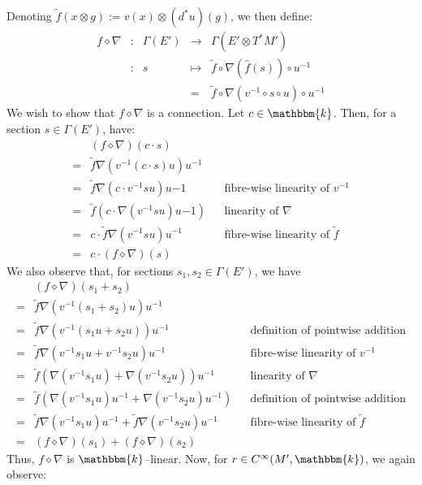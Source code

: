 \documentclass{amsart}
\newcommand{\K}{\mathbbm{k}}
\newcommand{\wh}{\widehat}
\newcommand{\tensor}{\otimes}
\renewcommand{\to}[1][]{\stackrel{#1}{\longrightarrow}}
\renewcommand{\mapsto}{\longmapsto}
\newcommand{\Cinf}{C^{\infty}}
\numberwithin{thm}{section}
\theoremstyle{definition}
\begin{document}
Denoting $\tilde{f}(x \tensor g) := v(x) \tensor (d^*u)(g)$, we then define:
\[\begin{array}{ccccc}
f \diamond \nabla
&:& \Gamma(E') &\to    & \Gamma(E' \tensor T^*M') \\
&:& s &\mapsto& \tilde{f} \circ \nabla(\wh{f}(s)) \circ u^{-1} \\
&&& = &
  \tilde{f} \circ \nabla(v^{-1} \circ s \circ u) \circ u^{-1}
\end{array}\]
We wish to show that $f \diamond \nabla$ is a connection.
Let $c \in \K$. Then, for a section $s \in \Gamma(E')$, have:
\begin{align*}
   & (f \diamond \nabla)(c \cdot s) \\
  =& \tilde{f}\nabla(v^{-1}(c \cdot s)u)u^{-1} \\
  =& \tilde{f}\nabla(c \cdot v^{-1}su)u{-1}
      && \text{fibre-wise linearity of } v^{-1} \\
  =& \tilde{f} (c \cdot  \nabla(v^{-1}su)u{-1})
      && \text{linearity of } \nabla \\
  =& c \cdot \tilde{f}\nabla(v^{-1}su)u^{-1}
      && \text{fibre-wise linearity of } \tilde{f} \\
  =& c \cdot (f \diamond \nabla)(s)
\end{align*}
We also observe that, for sections $s_1, s_2 \in \Gamma(E')$, we have
\begin{align*}
   & (f \diamond \nabla)(s_1 + s_2)\\
  =& \tilde{f}\nabla(v^{-1}(s_1 + s_2)u)u^{-1} \\
  =& \tilde{f}\nabla(v^{-1}(s_1u + s_2u))u^{-1}
    && \text{definition of pointwise addition} \\
  =& \tilde{f}\nabla(v^{-1}s_1u + v^{-1}s_2u)u^{-1}
    && \text{fibre-wise linearity of } v^{-1} \\
  =& \tilde{f}(\nabla(v^{-1}s_1u)
    + \nabla(v^{-1}s_2u))u^{-1}
    && \text{linearity of } \nabla \\
  =& \tilde{f}(\nabla(v^{-1}s_1u)u^{-1}
    + \nabla(v^{-1}s_2u)u^{-1})
    && \text{definition of pointwise addition} \\
  =& \tilde{f}\nabla(v^{-1}s_1u)u^{-1}
    + \tilde{f}\nabla(v^{-1}s_2u)u^{-1}
    && \text{fibre-wise linearity of } \tilde{f} \\
  =& (f \diamond \nabla)(s_1) + (f \diamond \nabla)(s_2)
\end{align*}
Thus, $f \diamond \nabla$ is $\K$--linear. Now, for $r \in \Cinf(M', \K)$, we
again observe:
\end{document}
